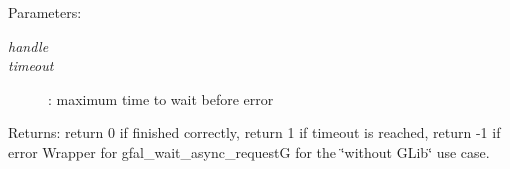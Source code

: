 \begin{Desc}
\item[Parameters:]
\begin{description}
\item[{\em handle}]\item[{\em timeout}]: maximum time to wait before error \end{description}
\end{Desc}
\begin{Desc}
\item[Returns:]return 0 if finished correctly, return 1 if timeout is reached, return -1 if error Wrapper for gfal\_\-wait\_\-async\_\-request\-G for the \char`\"{}without GLib\char`\"{} use case. \end{Desc}

